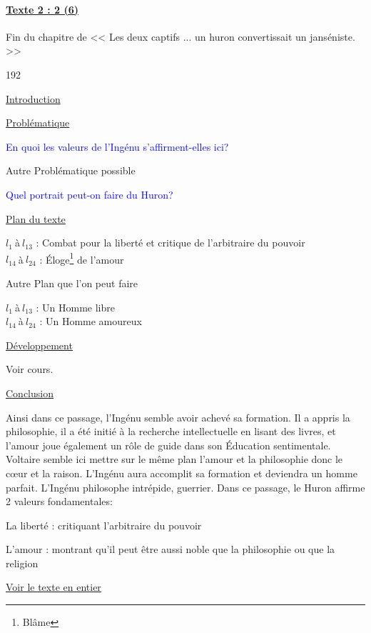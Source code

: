 \documentclass[12pt,a4paper]{article}
\begin{document}
							\paragraph[Texte 2 (6)]{\textbf{\underline{Texte 2 : 2 (6) }}}
		Fin du chapitre \textsc{} de << Les deux captifs ... un huron convertissait un janséniste. >>
\begin{dingautolist}{192}

\item \underline{Introduction} \par

\item \underline{Probl\'ematique }\par
	\textcolor{blue}{En quoi les valeurs de l'Ingénu s'affirment-elles ici?}\par
	Autre Problématique possible \par
	\textcolor{blue}{Quel portrait peut-on faire du Huron?}


\item \underline{Plan du texte} \par
	$l_{1}~$\`a$~l_{13}$ : Combat pour la liberté et critique de l'arbitraire du pouvoir\\
    $l_{14}~$\`a$~l_{24}$ : \'Eloge\footnote{Blâme} de l'amour \par
Autre Plan que l'on peut faire\par
	$l_{1}~$\`a$~l_{13}$ : Un Homme libre\\
    $l_{14}~$\`a$~l_{24}$ : Un Homme amoureux


\item \underline{D\'eveloppement} \par
        Voir cours.

\item \underline{Conclusion} \par
	Ainsi dans ce passage, l'Ingénu semble avoir achevé sa formation.
	Il a appris la philosophie, il a été initié à la recherche intellectuelle en lisant des livres, et l'amour joue également un rôle de guide dans son \'Education sentimentale. 
	Voltaire semble ici mettre sur le même plan l'amour et la philosophie donc le c\oe ur et la raison.
	L'Ingénu aura accomplit sa formation et deviendra un homme parfait.
	L'Ingénu philosophe intrépide, guerrier.
	Dans ce passage, le Huron affirme 2 valeurs fondamentales:\par
	La liberté : critiquant l'arbitraire du pouvoir\par
	L'amour : montrant qu'il peut être aussi noble que la philosophie ou que la religion \par

\end{dingautolist}
\href{.extra/Textes/Voltaire_Ingénu_Texte2.pdf}{Voir le texte en entier}
 \newpage
\end{document}

